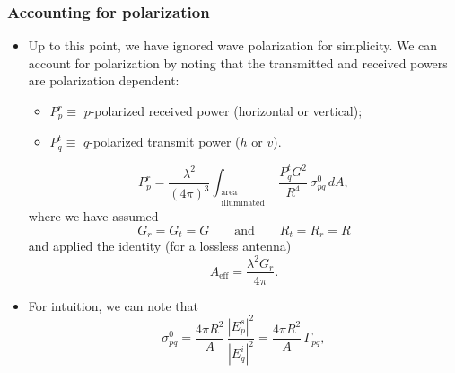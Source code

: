 \documentclass[11pt, oneside]{article}
\begin{document}
\subsubsection{Accounting for polarization}

\begin{itemize}
	\item Up to this point, we have ignored wave polarization for simplicity. We can account for polarization by noting that the transmitted and received powers are polarization dependent:
	\begin{itemize}
		\item $P_p^r \equiv$ $p$-polarized received power (horizontal or vertical);
		\item $P_q^t \equiv$ $q$-polarized transmit power ($h$ or $v$).
	\end{itemize}
	\begin{equation}
		\label{e:radar_pol}
		P_p^r = \frac{\lambda^2}{\left(4\pi\right)^3}\int_{\substack{\text{area}\\ \text{illuminated}}}\frac{P_q^tG^2}{R^4}\,\sigma_{pq}^0\,dA,
	\end{equation}
	where we have assumed
	\begin{equation}
		G_r = G_t = G \qquad \text{and} \qquad R_t = R_r = R
	\end{equation}
	and applied the identity (for a lossless antenna)
	\begin{equation}
		\label{e:Ae}
		A_\mathrm{eff} = \frac{\lambda^2G_r}{4\pi}.
	\end{equation}
	\item For intuition, we can note that
	\begin{equation}
		\label{e:sigma0_field}
		\sigma_{pq}^0 = \frac{4\pi R^2}{A}\,\frac{|E_p^s|^2}{|E_q^i|^2} = \frac{4\pi R^2}{A}\,\Gamma_{pq},

\end{equation}
\end{itemize}
\end{document}
